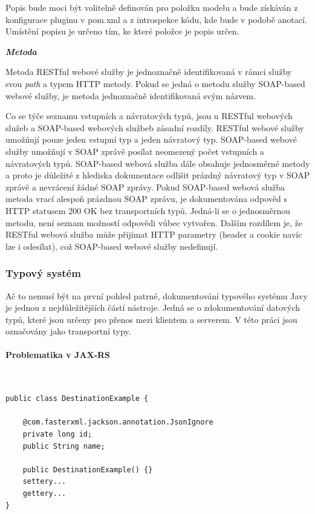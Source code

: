 \documentclass[11pt,twoside,a4paper]{book}
\begin{document}
Popis bude moci být volitelně definován pro položku modelu a bude získáván z konfigurace
pluginu v pom.xml a z introspekce kódu, kde bude v podobě anotací. Umístění popisu je
určeno tím, ke které položce je popis určen.

\textbf{\textit{Metoda}}

Metoda RESTful webové služby je jednoznačně identifikovaná v rámci služby svou
{\em path} a typem HTTP metody.
Pokud se jedná o metodu služby SOAP-based webové služby, je metoda jednoznačně
identifikovaná svým názvem.

Co se týče seznamu vstupních a návratových typů, jsou u RESTful webových služeb
a SOAP-based webových službeb zásadní rozdíly. RESTful webové služby umožňují
pouze jeden vstupní typ a jeden návratový typ. SOAP-based webové služby umožňují
v SOAP zprávě posílat neomezený počet vstupních a návratových typů. SOAP-based
webová služba dále obsahuje jednosměrné metody a proto je důležité z hlediska
dokumentace odlišit prázdný návratový typ v SOAP zprávě a nevrácení žádné SOAP
zprávy. Pokud SOAP-based webová služba metoda vrací alespoň prázdnou SOAP
zprávu, je dokumentována odpověd s HTTP statusem 200 OK bez transportních typů.
Jedná-li se o jednosměrnou metodu, není seznam možností odpovědi vůbec vytvořen.
Dalším rozdílem je, že RESTful webová služba může přijímat HTTP parametry
(header a cookie navíc lze i odesílat), což SOAP-based webové služby nedefinují.

\subsubsection{Typový systém}
\label{subsec:typovy-system}

Ač to nemusí být na první pohled patrné, dokumentování typového systému Javy je jednou z
nejdůležitějších částí nástroje. Jedná se o zdokumentování datových typů, které jsou určeny
pro přenos mezi klientem a serverem. V této práci jsou označovány jako transportní typy.

\paragraph{Problematika v JAX-RS}
\mbox{}\\

\begin{lstlisting}[frame=single,caption={Definice transportního
typu},label={lst:definice-transportniho-typu}] 
public class DestinationExample {

    @com.fasterxml.jackson.annotation.JsonIgnore
    private long id;
    public String name;

    public DestinationExample() {}
    settery...
    gettery...
}
\end{lstlisting}
\end{document}
